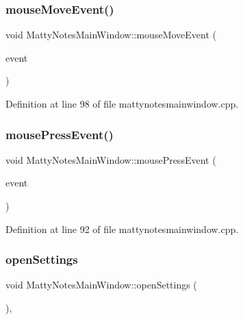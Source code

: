 \subsubsection{\texorpdfstring{mouse\+Move\+Event()}{mouseMoveEvent()}}
{\footnotesize\ttfamily void Matty\+Notes\+Main\+Window\+::mouse\+Move\+Event (\begin{DoxyParamCaption}\item[{Q\+Mouse\+Event $\ast$}]{event }\end{DoxyParamCaption})\hspace{0.3cm}{\ttfamily [private]}}



Definition at line 98 of file mattynotesmainwindow.\+cpp.

\hypertarget{classMattyNotesMainWindow_af6fed8f1ef3716a2b3074fd7f78ee23a}{}\label{classMattyNotesMainWindow_af6fed8f1ef3716a2b3074fd7f78ee23a} 
\subsubsection{\texorpdfstring{mouse\+Press\+Event()}{mousePressEvent()}}
{\footnotesize\ttfamily void Matty\+Notes\+Main\+Window\+::mouse\+Press\+Event (\begin{DoxyParamCaption}\item[{Q\+Mouse\+Event $\ast$}]{event }\end{DoxyParamCaption})\hspace{0.3cm}{\ttfamily [private]}}



Definition at line 92 of file mattynotesmainwindow.\+cpp.

\hypertarget{classMattyNotesMainWindow_a174545072bf37c8b69a8447855b636f7}{}\label{classMattyNotesMainWindow_a174545072bf37c8b69a8447855b636f7} 
\subsubsection{\texorpdfstring{open\+Settings}{openSettings}}
{\footnotesize\ttfamily void Matty\+Notes\+Main\+Window\+::open\+Settings (\begin{DoxyParamCaption}{ }\end{DoxyParamCaption})\hspace{0.3cm}{\ttfamily [private]}, {\ttfamily [slot]}}



